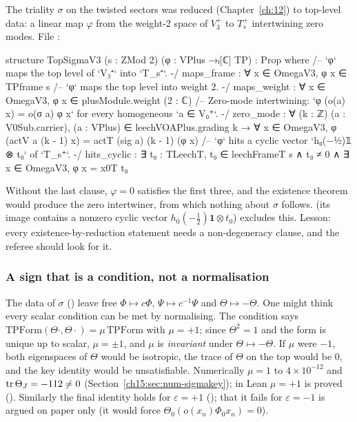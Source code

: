 The triality $\sigma$ on the twisted sectors was reduced (Chapter~\ref{ch:12}) to top-level data:
a linear map $\varphi$ from the weight-2 space of $V_3^+$ to $T_s^+$ intertwining zero modes. File
:
\begin{leancode}
structure TopSigmaV3 (s : ZMod 2) (φ : VPlus →ₗ[ℂ] TP) : Prop where
  /-- `φ` maps the top level of `V₃⁺` into `T_s⁺`. -/
  maps_frame : ∀ x ∈ OmegaV3, φ x ∈ TPframe s
  /-- `φ` maps the top level into weight 2. -/
  maps_weight : ∀ x ∈ OmegaV3, φ x ∈ plusModule.weight (2 : ℂ)
  /-- Zero-mode intertwining: `φ (o(a) x) = o(σ a) φ x` for every homogeneous `a ∈ V₀⁺`. -/
  zero_mode : ∀ (k : ℤ) (a : V0Sub.carrier), (a : VPlus) ∈ leechVOAPlus.grading k →
    ∀ x ∈ OmegaV3, φ (actV a (k - 1) x) = actT (sig a) (k - 1) (φ x)
  /-- `φ` hits a cyclic vector `h₀(−½)𝟙 ⊗ t₀` of `T_s⁺`. -/
  hits_cyclic : ∃ t₀ : TLeechT, t₀ ∈ leechFrameT s ∧ t₀ ≠ 0 ∧ ∃ x ∈ OmegaV3, φ x = x0T t₀
\end{leancode}
\begin{warning}
Without the last clause, $\varphi=0$ satisfies the first three, and the existence theorem
 would produce the zero intertwiner, from which nothing about $\sigma$
follows.  (its image contains a nonzero cyclic vector $h_0(-\frac12)\mathbf
1\otimes t_0$) excludes this. Lesson: every existence-by-reduction statement needs a
non-degeneracy clause, and the referee should look for it.
\end{warning}

\subsubsection{A sign that is a condition, not a normalisation}

The data of $\sigma$ () leave free $\Phi\mapsto c\Phi$, $\Psi\mapsto c^{-1}\Psi$ and
$\Theta\mapsto-\Theta$. One might think every scalar condition can be met by normalising. The
condition  says $\mathrm{TPForm}(\Theta\cdot,\Theta\cdot)=\mu\,\mathrm{TPForm}$ with
$\mu=+1$; since $\Theta^2=1$ and the form is unique up to scalar, $\mu=\pm1$, and $\mu$ is
\emph{invariant} under $\Theta\mapsto-\Theta$. If $\mu$ were $-1$, both eigenspaces of $\Theta$
would be isotropic, the trace of $\Theta$ on the top would be $0$, and the key identity would be
unsatisfiable. Numerically $\mu=1$ to $4\times10^{-12}$ and $\operatorname{tr}\Theta_J=-112\ne0$
(Section~\ref{ch15:sec:num-sigmakey}); in Lean $\mu=+1$ is proved ().
Similarly the final identity holds for $\varepsilon=+1$ (); that it fails for
$\varepsilon=-1$ is argued on paper only (it would force $\Theta_0(o(x_n)\Phi_0x_n)=0$).

